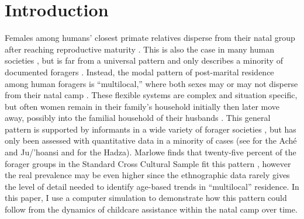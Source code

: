 \section{Introduction}
\label{intro}
Females among humans' closest primate relatives disperse from their natal group after reaching reproductive maturity \cite{nishida1987chimpanzees, gerloff1999intracommunity, stokes2003female}.  This is also the case in many human societies \cite{murdock1967ethnographic}, but is far from a universal pattern and only describes a minority of documented foragers \cite{alvarez2004residence, marlowe2004marital}.  Instead, the modal pattern of post-marital residence among human foragers is “multilocal,” where both sexes may or may not disperse from their natal camp \cite{hill2011co}.  These flexible systems are complex and situation specific, but often women remain in their family's household initially then later move away, possibly into the familial household of their husbands \cite{marlowe2004marital}.  This general pattern is supported by informants in a wide variety of forager societies \cite{lee1974male, hewlett1993intimate, marlowe2004marital, hill1996ache}, but has only been assessed with quantitative data in a minority of cases (see \cite{hill2011co_sup} for the Ach\'{e} and Ju/’hoansi and \cite{jones2005hadza} for the Hadza).  Marlowe finds that twenty-five percent of the forager groups in the Standard Cross Cultural Sample fit this pattern \cite{marlowe2004marital, murdock1969standard}, however the real prevalence may be even higher since the ethnographic data rarely gives the level of detail needed to identify age-based trends in “multilocal” residence.  In this paper, I use a computer simulation to demonstrate how this pattern could follow from the dynamics of childcare assistance within the natal camp over time. 

